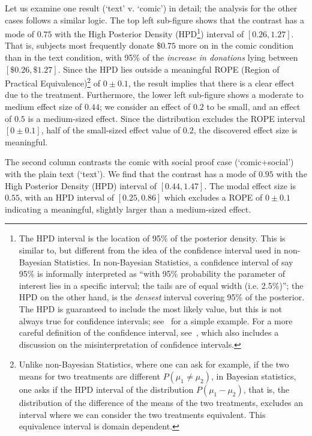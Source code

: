 Let us examine one result (`text' v. `comic') in detail; the analysis for the other cases follows a similar logic. The top left sub-figure shows that the contrast has a mode of $0.75$ with the High Posterior Density (HPD\footnote{The HPD interval is the location of 95\% of the posterior density. This is similar to, but different from the idea of the confidence interval used in non-Bayesian Statistics. In non-Bayesian Statistics, a confidence interval of say 95\% is informally interpreted as ``with 95\% probability the parameter of interest lies in a specific interval; the tails are of equal width (i.e. 2.5\%)''; the HPD on the other hand, is the \textit{densest} interval covering 95\% of the posterior. The HPD is guaranteed to include the most likely value, but this is not always true for confidence intervals; see~\textcite[][p. 57]{McElreath2015} for a simple example. For a more careful definition of the confidence interval, see~\textcite{Hoekstra2014}, which also includes a discussion on the misinterpretation of confidence intervals.}) interval of $[0.26, 1.27]$. That is, subjects most frequently donate $\$0.75$ more on in the comic condition than in the text condition, with 95\% of the \textit{increase in donations} lying between $[\$0.26, \$1.27]$. Since the HPD lies outside a meaningful ROPE (Region of Practical Equivalence)\footnote{Unlike non-Bayesian Statistics, where one can ask for example, if the two means for two treatments are different $P(\mu_1\neq \mu_2)$, in Bayesian statistics, one asks if the HPD interval of the distribution $P(\mu_1-\mu_2)$, that is, the distribution of the difference of the means of the two treatments, excludes an interval where we can consider the two treatments equivalent. This equivalence interval is domain dependent. } of $0 \pm 0.1$, the result implies that there is a clear effect due to the treatment. Furthermore, the lower left sub-figure shows a moderate to medium effect size of $0.44$; we consider an effect of $0.2$ to be small, and an effect of $0.5$ is a medium-sized effect. Since the distribution excludes the ROPE interval $[0 \pm 0.1]$, half of the small-sized effect value of $0.2$, the discovered effect size is meaningful. 

The second column contrasts the comic with social proof case (`comic+social') with the plain text (`text'). We find that the contrast has a mode of $0.95$ with the High Posterior Density (HPD) interval of $[0.44, 1.47]$. The modal effect size is $0.55$, with an HPD interval of $[0.25, 0.86]$ which excludes a ROPE of $0 \pm 0.1$ indicating a meaningful, slightly larger than a medium-sized effect.

